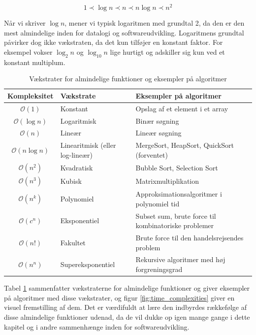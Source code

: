 \[
1 \prec \log n \prec n \prec n \log n \prec n^2
\]

\begin{remark}
    Når vi skriver $\log n$, mener vi typisk logaritmen med grundtal 2, da den er den mest almindelige inden for datalogi og softwareudvikling. Logaritmens grundtal påvirker dog ikke vækstraten, da det kun tilføjer en konstant faktor. For eksempel vokser $\log_2 n$ og $\log_{10} n$ lige hurtigt og adskiller sig kun ved et konstant multiplum.
\end{remark}

\begin{table}[htbp]
    \centering
    \renewcommand{\arraystretch}{1.4}
    \begin{tabular}{|c|l|l|}
        \hline
        \textbf{Kompleksitet} & \textbf{Vækstrate} & \textbf{Eksempler på algoritmer} \\
        \hline
        \( \mathcal{O}(1) \) & Konstant & Opslag af et element i et array \\
        \hline
        \( \mathcal{O}(\log n) \) & Logaritmisk & Binær søgning \\
        \hline
        \( \mathcal{O}(n) \) & Lineær & Lineær søgning \\
        \hline
        \( \mathcal{O}(n \log n) \) & Linearitmisk (eller log-lineær) & MergeSort, HeapSort, QuickSort (forventet) \\
        \hline
        \( \mathcal{O}(n^2) \) & Kvadratisk & Bubble Sort, Selection Sort \\
        \hline
        \( \mathcal{O}(n^3) \) & Kubisk & Matrixmultiplikation \\
        \hline
        \( \mathcal{O}(n^k) \) & Polynomiel & Approksimationsalgoritmer i polynomiel tid \\
        \hline
        \( \mathcal{O}(c^n) \) & Eksponentiel & Subset sum, brute force til kombinatoriske problemer \\
        \hline
        \( \mathcal{O}(n!) \) & Fakultet & Brute force til den handelsrejsendes problem \\
        \hline
        \( \mathcal{O}(n^n) \) & Supereksponentiel & Rekursive algoritmer med høj forgreningsgrad \\
        \hline
    \end{tabular}
    \caption{Vækstrater for almindelige funktioner og eksempler på algoritmer}
    \label{tab:growth_rates}
\end{table}


Tabel \ref{tab:growth_rates} sammenfatter vækstraterne for almindelige funktioner og giver eksempler på algoritmer med disse vækstrater, og figur \ref{fig:time_complexities} giver en visuel fremstilling af dem. Det er værdifuldt at lære den indbyrdes rækkefølge af disse almindelige funktioner udenad, da de vil dukke op igen mange gange i dette kapitel og i andre sammenhænge inden for softwareudvikling.

